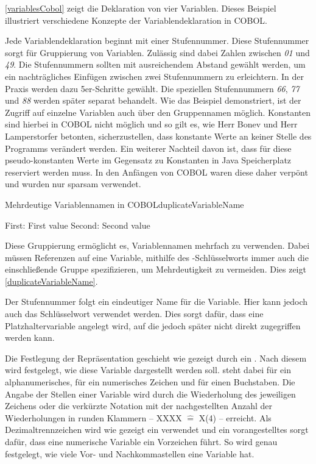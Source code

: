 \autoref{variablesCobol} zeigt die Deklaration von vier Variablen. Dieses Beispiel illustriert verschiedene Konzepte der Variablendeklaration in COBOL.

Jede Variablendeklaration beginnt mit einer Stufennummer. Diese Stufennummer sorgt für Gruppierung von Variablen. Zulässig sind dabei Zahlen zwischen \textit{01} und \textit{49}. Die Stufennummern sollten mit ausreichendem Abstand gewählt werden, um ein nachträgliches Einfügen zwischen zwei Stufennummern zu erleichtern. In der Praxis werden dazu \idR 5er-Schritte gewählt. Die speziellen Stufennummern \textit{66}, \textit{77} und \textit{88} werden später separat behandelt. Wie das Beispiel demonstriert, ist der Zugriff auf einzelne Variablen auch über den Gruppennamen möglich. Konstanten sind hierbei in COBOL nicht möglich und so gilt es, wie Herr Bonev und Herr Lamperstorfer betonten, sicherzustellen, dass konstante Werte an keiner Stelle des Programms verändert werden. Ein weiterer Nachteil davon ist, dass für diese pseudo-konstanten Werte im Gegensatz zu Konstanten in Java Speicherplatz reserviert werden muss. In den Anfängen von COBOL waren diese  daher verpönt und wurden nur sparsam verwendet.

\begin{codeWithCaption}{Mehrdeutige Variablennamen in COBOL}{duplicateVariableName}
     \cFollow
    \begin{shellwindow}
    First: First value         
    Second: Second value  
    \end{shellwindow}
\end{codeWithCaption}

Diese Gruppierung ermöglicht es, Variablennamen mehrfach zu verwenden. Dabei müssen Referenzen auf eine Variable, mithilfe des -Schlüsselworts immer auch die einschließende Gruppe spezifizieren, um Mehrdeutigkeit zu vermeiden. Dies zeigt \autoref{duplicateVariableName}.

Der Stufennummer folgt ein eindeutiger Name für die Variable. Hier kann jedoch auch das Schlüsselwort  verwendet werden. Dies sorgt dafür, dass eine Platzhaltervariable angelegt wird, auf die jedoch später nicht direkt zugegriffen werden kann.

Die Festlegung der Repräsentation geschieht wie gezeigt durch ein . Nach diesem  wird festgelegt, wie diese Variable dargestellt werden soll.  steht dabei für ein alphanumerisches,  für ein numerisches Zeichen und  für einen Buchstaben. Die Angabe der Stellen einer Variable wird durch die Wiederholung des jeweiligen Zeichens oder die verkürzte Notation mit der nachgestellten Anzahl der Wiederholungen in runden Klammern -- \zB XXXX $\widehat{=}$ X(4) -- erreicht. Als Dezimaltrennzeichen wird wie gezeigt ein  verwendet und ein vorangestelltes  sorgt dafür, dass eine numerische Variable ein Vorzeichen führt. So wird genau festgelegt, wie viele Vor- und Nachkommastellen eine Variable hat.

